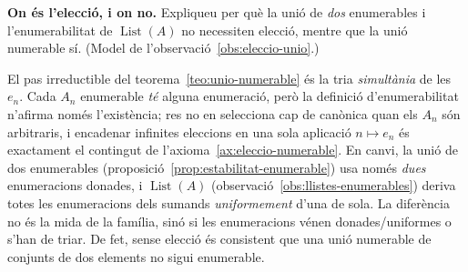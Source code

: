 \begin{exercici}
\textbf{On és l'elecció, i on no.} Expliqueu per què la unió de \emph{dos} enumerables i l'enumerabilitat de \(\operatorname{List}(A)\) no necessiten elecció, mentre que la unió numerable sí. (Model de l'observació~\ref{obs:eleccio-unio}.)
\end{exercici}
\begin{solucio}
El pas irreductible del teorema~\ref{teo:unio-numerable} és la tria \emph{simultània} de les \(e_n\). Cada \(A_n\) enumerable \emph{té} alguna enumeració, però la definició d'enumerabilitat n'afirma només l'existència; res no en selecciona cap de canònica quan els \(A_n\) són arbitraris, i encadenar infinites eleccions en una sola aplicació \(n\mapsto e_n\) és exactament el contingut de l'axioma~\ref{ax:eleccio-numerable}. En canvi, la unió de dos enumerables (proposició~\ref{prop:estabilitat-enumerable}) usa només \emph{dues} enumeracions donades, i \(\operatorname{List}(A)\) (observació~\ref{obs:llistes-enumerables}) deriva totes les enumeracions dels sumands \emph{uniformement} d'una de sola. La diferència no és la mida de la família, sinó si les enumeracions vénen donades/uniformes o s'han de triar. De fet, sense elecció és consistent que una unió numerable de conjunts de dos elements no sigui enumerable.
\end{solucio}
